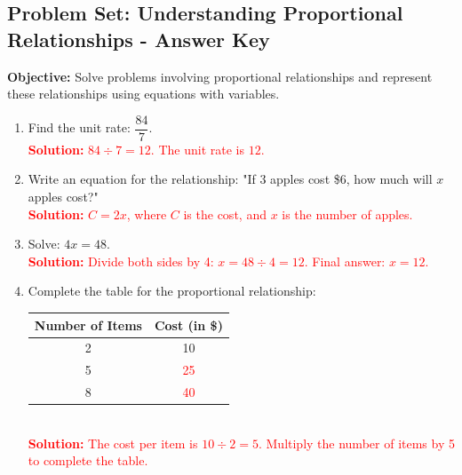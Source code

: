 \documentclass[10pt]{article}
\newcommand{\dsfrac}[2]{\dfrac{#1}{#2}} %
\begin{document}
\subsection*{Problem Set: Understanding Proportional Relationships - Answer Key}
\onehalfspacing

\begin{tcolorbox}[colframe=black!40, colback=gray!5, 
coltitle=black, colbacktitle=black!20, fonttitle=\bfseries\Large, 
title=Learning Objective, halign title=center, left=5pt, right=5pt, top=5pt, bottom=15pt]
\textbf{Objective:} Solve problems involving proportional relationships and represent these relationships using equations with variables.
\end{tcolorbox}

\begin{tcolorbox}[colframe=black!60, colback=white, 
coltitle=black, colbacktitle=black!15, fonttitle=\bfseries\Large, 
title=Exercises, halign title=center, left=10pt, right=10pt, top=10pt, bottom=35pt]
\begin{enumerate}[itemsep=2em]
    \item Find the unit rate: \( \dsfrac{84}{7} \).\\
    \textcolor{red}{\textbf{Solution:} \( 84 \div 7 = 12 \). The unit rate is \( 12 \).}

    \item Write an equation for the relationship: "If 3 apples cost \$6, how much will \(x\) apples cost?"\\
    \textcolor{red}{\textbf{Solution:} \( C = 2x \), where \(C\) is the cost, and \(x\) is the number of apples.}

    \item Solve: \(4x = 48\).\\
    \textcolor{red}{\textbf{Solution:} Divide both sides by 4: \(x = 48 \div 4 = 12\). Final answer: \(x = 12\).}

    \item Complete the table for the proportional relationship:
    \newline 
    \begin{tabular}{|c|c|}
        \hline
        Number of Items & Cost (in \$) \\ \hline
        2 & 10 \\ \hline
        5 & \textcolor{red}{25} \\ \hline
        8 & \textcolor{red}{40} \\ \hline
    \end{tabular}\\
    \textcolor{red}{\textbf{Solution:} The cost per item is \(10 \div 2 = 5\). Multiply the number of items by 5 to complete the table.}


\end{enumerate}
\end{tcolorbox}
\end{document}

